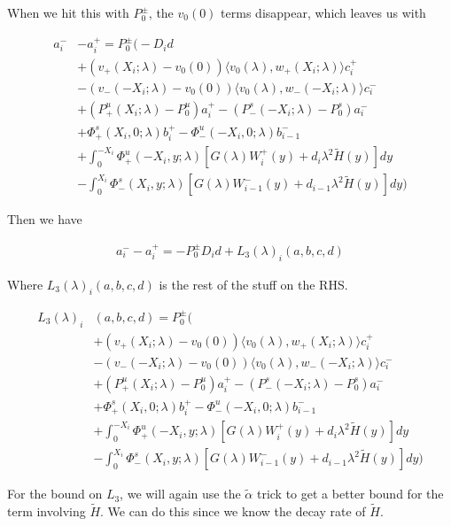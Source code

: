 \documentclass[12pt]{article}
\begin{document}
\begin{enumerate}
When we hit this with $P_0^\pm$, the $v_0(0)$ terms disappear, which leaves us with

\begin{align*}
a_i^- &- a_i^+ = P_0^\pm \Big(-D_i d \\
&+(v_+(X_i; \lambda) - v_0(0)) \langle v_0(\lambda), w_+(X_i; \lambda) \rangle c_i^+ \\
&- (v_-(-X_i; \lambda) - v_0(0)) \langle v_0(\lambda), w_-(-X_i; \lambda) \rangle c_i^- \\
&+ (P^u_+(X_i; \lambda) - P_0^u)a_i^+ - (P^s_-(-X_i; \lambda) - P_0^s)a_i^- \\
&+ \Phi^s_+(X_i, 0; \lambda)b_i^+ - \Phi^u_-(-X_i, 0; \lambda)b_{i-1}^- \\
&+ \int_0^{-X_i} \Phi^u_+(-X_i, y; \lambda) [ G(\lambda)W_i^+(y) + d_i \lambda^2 \tilde{H}(y) ] dy \\
&- \int_0^{X_i} \Phi^s_-(X_i, y; \lambda) [ G(\lambda)W_{i-1}^-(y) + d_{i-1} \lambda^2 \tilde{H}(y) ] dy \Big)
\end{align*}

Then we have

\begin{align*}
a_i^- - a_i^+ = -P_0^\pm D_i d + L_3(\lambda)_i(a, b, c, d)
\end{align*}

Where $L_3(\lambda)_i(a, b, c, d)$ is the rest of the stuff on the RHS.

\begin{align*}
L_3(\lambda)_i&(a, b, c, d) = P_0^\pm \Big( \\
&+(v_+(X_i; \lambda) - v_0(0)) \langle v_0(\lambda), w_+(X_i; \lambda) \rangle c_i^+ \\
&- (v_-(-X_i; \lambda) - v_0(0)) \langle v_0(\lambda), w_-(-X_i; \lambda) \rangle c_i^- \\
&+ (P^u_+(X_i; \lambda) - P_0^u)a_i^+ - (P^s_-(-X_i; \lambda) - P_0^s)a_i^- \\
&+ \Phi^s_+(X_i, 0; \lambda)b_i^+ - \Phi^u_-(-X_i, 0; \lambda)b_{i-1}^- \\
&+ \int_0^{-X_i} \Phi^u_+(-X_i, y; \lambda) [ G(\lambda)W_i^+(y) + d_i \lambda^2 \tilde{H}(y) ] dy \\
&- \int_0^{X_i} \Phi^s_-(X_i, y; \lambda) [ G(\lambda)W_{i-1}^-(y) + d_{i-1} \lambda^2 \tilde{H}(y) ] dy \Big)
\end{align*}

For the bound on $L_3$, we will again use the $\tilde{\alpha}$ trick to get a better bound for the term involving $\tilde{H}$. We can do this since we know the decay rate of $\tilde{H}$.


\end{enumerate}
\end{document}
